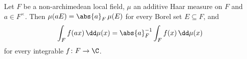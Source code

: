 Let $F$ be a non-archimedean local field, $\mu$ an additive Haar measure on $F$ and $a\in F^\times$. Then
$\mu(aE)=\abs{a}_F\,\mu(E)$ for every Borel set $E\subseteq F$, and
\[
  \int_F f(ax)\,\dd\mu(x)=\abs{a}_F^{-1}\int_F f(x)\,\dd\mu(x)
\]
for every integrable $f\colon F\to\C$.
